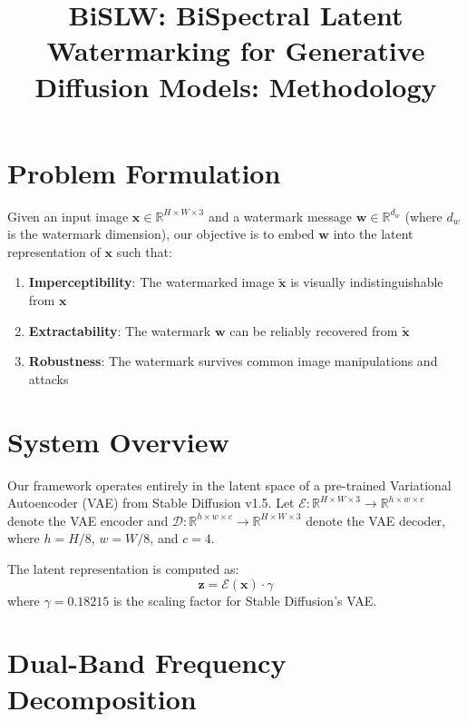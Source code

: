 \documentclass[11pt]{article}
\title{BiSLW: BiSpectral Latent Watermarking for Generative Diffusion Models: Methodology}
\author{}
\date{}
\begin{document}
\maketitle

\section{Problem Formulation}

Given an input image $\mathbf{x} \in \mathbb{R}^{H \times W \times 3}$ and a watermark message $\mathbf{w} \in \mathbb{R}^{d_w}$ (where $d_w$ is the watermark dimension), our objective is to embed $\mathbf{w}$ into the latent representation of $\mathbf{x}$ such that:

\begin{enumerate}
    \item \textbf{Imperceptibility}: The watermarked image $\tilde{\mathbf{x}}$ is visually indistinguishable from $\mathbf{x}$
    \item \textbf{Extractability}: The watermark $\mathbf{w}$ can be reliably recovered from $\tilde{\mathbf{x}}$
    \item \textbf{Robustness}: The watermark survives common image manipulations and attacks
\end{enumerate}

\section{System Overview}

Our framework operates entirely in the latent space of a pre-trained Variational Autoencoder (VAE) from Stable Diffusion v1.5. Let $\mathcal{E}: \mathbb{R}^{H \times W \times 3} \rightarrow \mathbb{R}^{h \times w \times c}$ denote the VAE encoder and $\mathcal{D}: \mathbb{R}^{h \times w \times c} \rightarrow \mathbb{R}^{H \times W \times 3}$ denote the VAE decoder, where $h = H/8$, $w = W/8$, and $c = 4$.

The latent representation is computed as:
\begin{equation}
    \mathbf{z} = \mathcal{E}(\mathbf{x}) \cdot \gamma
\end{equation}
where $\gamma = 0.18215$ is the scaling factor for Stable Diffusion's VAE.

\section{Dual-Band Frequency Decomposition}
\end{document}

